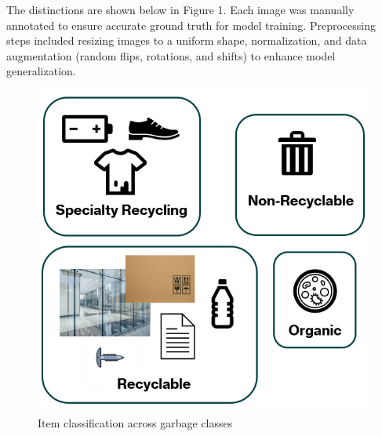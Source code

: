 \documentclass[11pt,twocolumn]{article}
\begin{document}
The distinctions are shown below in Figure 1. Each image was manually annotated to ensure accurate ground truth for model training. Preprocessing steps included resizing images to a uniform shape, normalization, and data augmentation (random flips, rotations, and shifts) to enhance model generalization.

\begin{figure}[h]
    \centering
    \includegraphics[width=0.8\linewidth]{report_images/dataset_classes.png}
    \caption{Item classification across garbage classes}
    \label{fig:dataset}
\end{figure}
\end{document}
